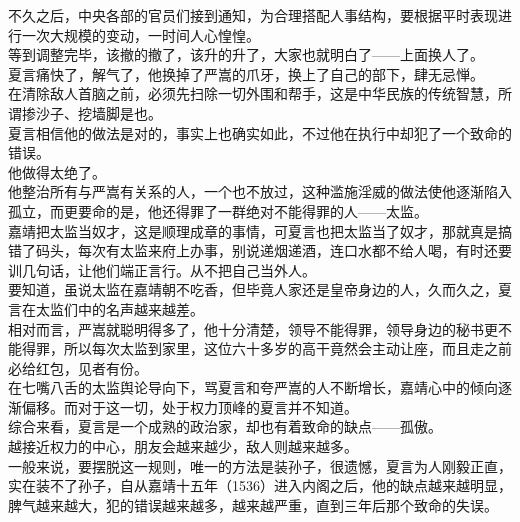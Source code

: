 \begin{multicols}{\theparacolNo}
不久之后，中央各部的官员们接到通知，为合理搭配人事结构，要根据平时表现进行一次大规模的变动，一时间人心惶惶。\\

等到调整完毕，该撤的撤了，该升的升了，大家也就明白了——上面换人了。\\

夏言痛快了，解气了，他换掉了严嵩的爪牙，换上了自己的部下，肆无忌惮。\\

在清除敌人首脑之前，必须先扫除一切外围和帮手，这是中华民族的传统智慧，所谓掺沙子、挖墙脚是也。\\

夏言相信他的做法是对的，事实上也确实如此，不过他在执行中却犯了一个致命的错误。\\

他做得太绝了。\\

他整治所有与严嵩有关系的人，一个也不放过，这种滥施淫威的做法使他逐渐陷入孤立，而更要命的是，他还得罪了一群绝对不能得罪的人——太监。\\

嘉靖把太监当奴才，这是顺理成章的事情，可夏言也把太监当了奴才，那就真是搞错了码头，每次有太监来府上办事，别说递烟递酒，连口水都不给人喝，有时还要训几句话，让他们端正言行。从不把自己当外人。\\

要知道，虽说太监在嘉靖朝不吃香，但毕竟人家还是皇帝身边的人，久而久之，夏言在太监们中的名声越来越差。\\

相对而言，严嵩就聪明得多了，他十分清楚，领导不能得罪，领导身边的秘书更不能得罪，所以每次太监到家里，这位六十多岁的高干竟然会主动让座，而且走之前必给红包，见者有份。\\

在七嘴八舌的太监舆论导向下，骂夏言和夸严嵩的人不断增长，嘉靖心中的倾向逐渐偏移。而对于这一切，处于权力顶峰的夏言并不知道。\\

综合来看，夏言是一个成熟的政治家，却也有着致命的缺点——孤傲。\\

越接近权力的中心，朋友会越来越少，敌人则越来越多。\\

一般来说，要摆脱这一规则，唯一的方法是装孙子，很遗憾，夏言为人刚毅正直，实在装不了孙子，自从嘉靖十五年（1536）进入内阁之后，他的缺点越来越明显，脾气越来越大，犯的错误越来越多，越来越严重，直到三年后那个致命的失误。\\


\end{multicols}
